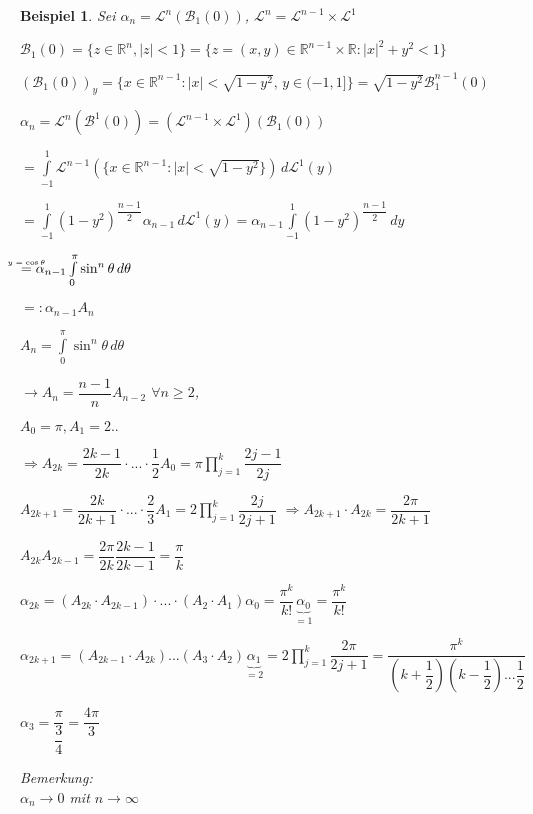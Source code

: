 \documentclass[11pt]{memoir}
\theoremstyle{changebreak}
\newtheorem{Beispiel}{Beispiel}[chapter]
\newcommand\overequal[1]{\mathrel{\overset{\makebox[0pt]{\mbox{\normalfont\tiny\sffamily $ #1 $}}}{=}}}
\begin{document}
\begin{Beispiel}
Sei $\alpha_n = \mathscr L^n(\mathscr B_1(0))$,
$\mathscr L^n = \mathscr L^{n-1} \times \mathscr L^1$\\
\par
$\mathscr B_1(0) = \{z \in \mathbb R^n,|z| < 1\} = \{z = (x, y) \in \mathbb R^{n-1} \times \mathbb R: |x|^2 + y^2 <1\} $
\par\bigskip
$(\mathscr B_1(0))_y = \{x \in \mathbb R^{n-1}: |x| < \sqrt{1-y^2},\,  y \in (-1, 1]\} = \sqrt{1-y^2}\mathscr B_1^{n-1} (0) $
\par\bigskip
$\alpha_n = \mathscr L^n(\mathscr B^1(0)) = (\mathscr L^{n-1} \times \mathscr L^1)(\mathscr B_1(0))$
\par\bigskip
$ = \int\limits_{-1}^1 \mathscr L^{n-1}\left(\{x \in \mathbb R^{n-1}: |x| < \sqrt{1 -y^2}\}\right)\, d\mathscr L^1(y) $
\par\bigskip
$=\int\limits_{-1}^1 (1- y^2)^{\dfrac{n-1}{2}} \alpha_{n-1}\, d\mathscr L^1(y) = \alpha_{n-1} \int\limits_{-1}^1 (1 - y^2)^{\dfrac{n-1}{2}} \, dy $
\par\bigskip
$\overequal{y = \cos{\theta}}  \alpha_{n-1} \int\limits_0^\pi \sin^n \theta \, d\theta $
\par\bigskip
$=: \alpha_{n-1} A_n$  \\
\par\bigskip
$A_n = \int\limits_0^\pi \sin^n \theta\, d\theta$
\par\bigskip
$\rightarrow A_n = \dfrac{n-1}{n} A_{n-2}$ $\forall n \geq 2$,
\par\bigskip
 $A_0 = \pi, A_1 = 2..$
 \par\bigskip
$\Rightarrow A_{2k} = \dfrac{2k -1}{2k} \cdotp ... \cdotp \dfrac{1}{2} A_0 = \pi \prod\limits_{j=1}^k \dfrac{2j -1}{2j}$
\par\bigskip
$A_{2k+1} = \dfrac{2k}{2k+1} \cdotp ... \cdotp \dfrac{2}{3} A_1 = 2 \prod\limits_{j=1}^k \dfrac{2j}{2j+1}$
$\Rightarrow A_{2k+1} \cdotp A_{2k} = \dfrac{2\pi}{2k +1}$
\par\bigskip
$A_{2k} A_{2k-1} = \dfrac{2\pi}{2k} \dfrac{2k-1}{2k-1} = \dfrac{\pi}{k}$
\par\bigskip
$\alpha_{2k} = (A_{2k} \cdotp A_{2k-1})\cdotp ... \cdotp (A_2 \cdotp A_1) \alpha_0 = \dfrac{\pi^k}{k!}\underbrace{\alpha_0}_{=1} = \dfrac{\pi^k}{k!}$
\par\bigskip
$\alpha_{2k+1} = (A_{2k-1}\cdotp A_{2k}) ... (A_3 \cdotp A_2) \underbrace{\alpha_1}_{=2} = 2 \prod\limits_{j=1}^k \dfrac{2\pi}{2j+1} = \dfrac{\pi^k}{\left(k + \dfrac{1}{2}\right)\left(k- \dfrac{1}{2}\right)... \dfrac{1}{2}}$
\par\bigskip
$\alpha_3 = \dfrac{\pi}{\dfrac{3}{4}} = \dfrac{4\pi}{3}$
\par\bigskip
\emph{Bemerkung}: \\

$\alpha_n \rightarrow 0$ mit $n \rightarrow \infty$
\end{Beispiel}
\end{document}
